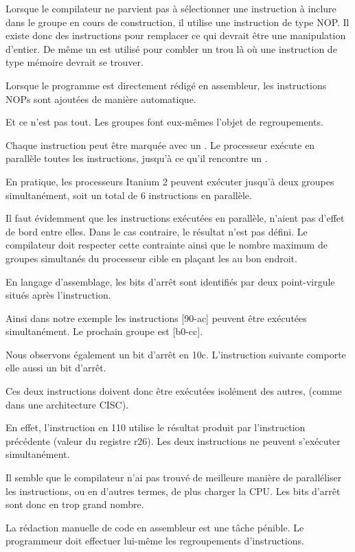 Lorsque le compilateur ne parvient pas à sélectionner une instruction à inclure dans le groupe en
cours de construction, il utilise une instruction de type \ac{NOP}. Il existe donc des instructions
 pour remplacer ce qui devrait être une manipulation d'entier. De même un  est
utilisé pour combler un trou là où une instruction de type mémoire devrait se trouver.

Lorsque le programme est directement rédigé en assembleur, les instructions \ac{NOP}s sont ajoutées
de manière automatique.

Et ce n'est pas tout. Les groupes font eux-mêmes l'objet de regroupements.

Chaque instruction peut être marquée avec un . Le processeur exécute en parallèle toutes
les instructions, jusqu'à ce qu'il rencontre un .

En pratique, les processeurs Itanium 2 peuvent exécuter jusqu'à deux groupes simultanément, soit un
total de  6 instructions en parallèle.

Il faut évidemment que les instructions exécutées en parallèle, n'aient pas d'effet de bord entre
elles. Dans le cas contraire, le résultat n'est pas défini.
Le compilateur doit respecter cette contrainte ainsi que le nombre maximum de groupes simultanés du
processeur cible en plaçant les  au bon endroit.

En langage d'assemblage, les bits d'arrêt sont identifiés par deux point-virgule situés après
l'instruction.

Ainsi dans notre exemple les instructions [90-ac] peuvent être exécutées simultanément. Le prochain
groupe est [b0-cc].

Nous observons également un bit d'arrêt en 10c. L'instruction suivante comporte elle aussi un bit
d'arrêt.

Ces deux instructions doivent donc être exécutées isolément des autres, (comme dans une architecture
\ac{CISC}).

En effet, l'instruction en 110 utilise le résultat produit par l'instruction précédente (valeur du
registre r26). Les deux instructions ne peuvent s'exécuter simultanément.

Il semble que le compilateur n'ai pas trouvé de meilleure manière de paralléliser les instructions,
ou en d'autres termes, de plus charger la \ac{CPU}. Les bits d'arrêt sont donc en trop grand nombre.

La rédaction manuelle de code en assembleur est une tâche pénible. Le programmeur doit effectuer
lui-même les regroupements d'instructions.

